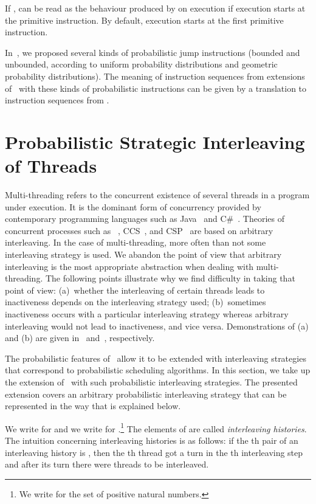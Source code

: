 \documentclass{llncs}
\begin{document}
If , 
 can be 
read as the behaviour produced by  on 
execution if execution starts at the  primitive 
instruction.
By default, execution starts at the first primitive instruction.

In~\cite{BM09f}, we proposed several kinds of probabilistic jump
instructions (bounded and unbounded, according to uniform probability 
distributions and geometric probability distributions).
The meaning of instruction sequences from extensions of \prPGLB\ with
these kinds of probabilistic instructions can be given by a translation 
to instruction sequences from \prPGLB.

\section{Probabilistic Strategic Interleaving of Threads}
\label{sect-strategic-interleaving}

Multi-threading refers to the concurrent existence of several threads
in a program under execution.
It is the dominant form of concurrency provided by contemporary 
programming languages such as Java~\cite{GJSB00a} and C\#~\cite{HWG03a}.
Theories of concurrent processes such as \ACP~\cite{BW90}, 
CCS~\cite{Mil89}, and CSP~\cite{Hoa85} are based on arbitrary 
interleaving.
In the case of multi-threading, more often than not some interleaving 
strategy is used.
We abandon the point of view that arbitrary interleaving is the most 
appropriate abstraction when dealing with multi-threading.
The following points illustrate why we find difficulty in taking that
point of view:
(a)~whether the interleaving of certain threads leads to inactiveness
depends on the interleaving strategy used;
(b)~sometimes inactiveness occurs with a particular interleaving
strategy whereas arbitrary interleaving would not lead to inactiveness, 
and vice versa.
Demonstrations of (a) and (b) are given in~\cite{BM04c}
and~\cite{BM05c}, respectively.

The probabilistic features of \prBTA\ allow it to be extended with 
interleaving strategies that correspond to probabilistic scheduling 
algorithms.
In this section, we take up the extension of \prBTA\ with such
probabilistic interleaving strategies.
The presented extension covers an arbitrary probabilistic interleaving 
strategy that can be represented in the way that is explained below.

We write  for  and 
we write  for .\footnote
{We write  for the set  of 
positive natural numbers.}
The elements of  are called \emph{interleaving histories}.
The intuition concerning interleaving histories is as follows:
if the th pair of an interleaving history is , then the 
th thread got a turn in the th interleaving step and after its
turn there were  threads to be interleaved.
\end{document}

